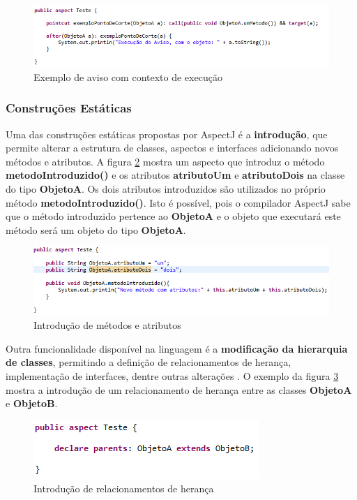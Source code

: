 \begin{figure}[!hb]
	\centering
	\includegraphics[scale=0.9]{img/advice_code.png}
	\caption{Exemplo de aviso com contexto de execução}\label{fig:advice_code}
\end{figure}

\subsubsection{Construções Estáticas}

Uma das construções estáticas propostas por AspectJ é a \textbf{introdução}, que
permite alterar a estrutura de classes, aspectos e interfaces adicionando novos
métodos e atributos. A figura \ref{fig:introduction} mostra um aspecto que
introduz o método \textbf{metodoIntroduzido()} e os atributos
\textbf{atributoUm} e \textbf{atributoDois} na classe do tipo \textbf{ObjetoA}.
Os dois atributos introduzidos são utilizados no próprio método
\textbf{metodoIntroduzido()}. Isto é possível, pois
o compilador AspectJ sabe que o método introduzido pertence ao \textbf{ObjetoA}
e o objeto que executará este método será um objeto do tipo \textbf{ObjetoA}.

\begin{figure}
	\centering
	\includegraphics[scale=0.9]{img/introduction.png}
	\caption{Introdução de métodos e atributos}\label{fig:introduction}
\end{figure}

Outra funcionalidade disponível na linguagem é a \textbf{modificação da hierarquia de classes}, permitindo a definição de
relacionamentos de herança, implementação de interfaces, dentre outras
alterações \cite{Laddad:2003:AAP:993468}. O exemplo da figura
\ref{fig:introduction_interface} mostra a introdução de um relacionamento de
herança entre as classes \textbf{ObjetoA} e \textbf{ObjetoB}.

\begin{figure}
	\centering
	\includegraphics{img/introduction_interface.png}
	\caption{Introdução de relacionamentos de herança}\label{fig:introduction_interface}
\end{figure}

